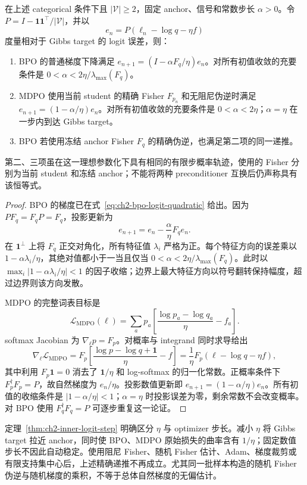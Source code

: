 \begin{theorem}
\label{thm:ch2-inner-logit-step}
在上述 categorical 条件下且 $|\mathcal V|\ge2$，固定 anchor、信号和常数步长 $\alpha>0$。令 $P=I-\mathbf1\mathbf1^\top/|\mathcal V|$，并以
\[
 e_n=P(\ell_n-\log q-\eta f)
\]
度量相对于 Gibbs target 的 logit 误差，则：
\begin{enumerate}
 \item BPO 的普通梯度下降满足 $e_{n+1}=(I-\alpha F_q/\eta)e_n$。对所有初值收敛的充要条件是 $0<\alpha<2\eta/\lambda_{\max}(F_q)$。
 \item MDPO 使用当前 student 的精确 Fisher $F_{p_n}$ 和无阻尼伪逆时满足 $e_{n+1}=(1-\alpha/\eta)e_n$。对所有初值收敛的充要条件是 $0<\alpha<2\eta$；$\alpha=\eta$ 在一步内到达 Gibbs target。
 \item BPO 若使用冻结 anchor Fisher $F_q$ 的精确伪逆，也满足第二项的同一递推。
\end{enumerate}
第二、三项虽在这一理想参数化下具有相同的有限步概率轨迹，使用的 Fisher 分别为当前 student 和冻结 anchor；不能将两种 preconditioner 互换后仍声称具有该恒等式。
\end{theorem}

\begin{proof}
BPO 的梯度已在式~\eqref{eq:ch2-bpo-logit-quadratic} 给出。因为 $PF_q=F_qP=F_q$，投影更新为
\[
 e_{n+1}=e_n-\frac\alpha\eta F_qe_n.
\]
在 $\mathbf1^\perp$ 上将 $F_q$ 正交对角化，所有特征值 $\lambda_i$ 严格为正。每个特征方向的误差乘以 $1-\alpha\lambda_i/\eta$，其绝对值都小于一当且仅当 $0<\alpha<2\eta/\lambda_{\max}(F_q)$。此时以 $\max_i|1-\alpha\lambda_i/\eta|<1$ 的因子收缩；边界上最大特征方向以符号翻转保持幅度，超过边界则该方向发散。

MDPO 的完整词表目标是
\[
 \mathcal L_{\mathrm{MDPO}}(\ell)
 =\sum_ap_a\left[\frac{\log p_a-\log q_a}{\eta}-f_a\right].
\]
softmax Jacobian 为 $\nabla_\ell p=F_p$。对概率与 integrand 同时求导给出
\[
 \nabla_\ell\mathcal L_{\mathrm{MDPO}}
 =F_p\left[\frac{\log p-\log q+\mathbf1}{\eta}-f\right]
 =\frac1\eta F_p(\ell-\log q-\eta f),
\]
其中利用 $F_p\mathbf1=0$ 消去了 $\mathbf1/\eta$ 和 log-softmax 的归一化常数。正概率条件下 $F_p^\dagger F_p=P$，故自然梯度为 $e_n/\eta$。投影数值更新即 $e_{n+1}=(1-\alpha/\eta)e_n$。所有初值的收缩条件是 $|1-\alpha/\eta|<1$；$\alpha=\eta$ 时投影误差为零，剩余常数不会改变概率。对 BPO 使用 $F_q^\dagger F_q=P$ 可逐步重复这一论证。
\end{proof}

定理~\ref{thm:ch2-inner-logit-step} 明确区分 $\eta$ 与 optimizer 步长。减小 $\eta$ 将 Gibbs target 拉近 anchor，同时使 BPO、MDPO 原始损失的曲率含有 $1/\eta$；固定数值步长不因此自动稳定。使用阻尼 Fisher、随机 Fisher 估计、Adam、梯度裁剪或有限支持集中心后，上述精确递推不再成立。尤其同一批样本构造的随机 Fisher 伪逆与随机梯度的乘积，不等于总体自然梯度的无偏估计。

